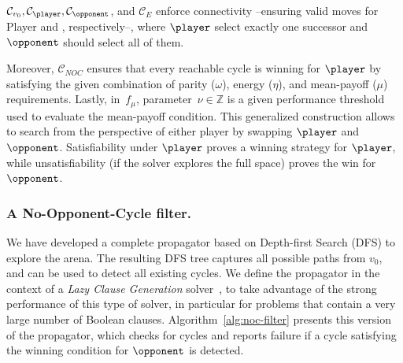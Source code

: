 \documentclass[a4paper,UKenglish,cleveref, autoref, thm-restate, anonymous]{lipics-v2021}
\begin{document}
$\mathcal{C}_{v_0}, \mathcal{C}_{\player}, \mathcal{C}_{\opponent}$, and $\mathcal{C}_{\!E}$ enforce connectivity --ensuring valid moves for Player \even and \odd, respectively--, where $\player$ select exactly one successor and $\opponent$ should select all of them.  

Moreover, $\mathcal{C}_{\!N\!O\!C}$ ensures that every reachable cycle is winning for $\player$ by satisfying the given combination of parity ($\omega$), energy ($\eta$), and mean-payoff ($\mu$) requirements. Lastly, in~$f_\mu$, parameter~$\nu \in \mathbb{Z}$ is a given performance threshold used to evaluate the mean-payoff condition. This generalized construction allows \nocq to search from the perspective of either player by swapping $\player$ and $\opponent$. Satisfiability under $\player$ proves a winning strategy for $\player$, while unsatisfiability (if the solver explores the full space) proves the win for $\opponent$.

\subsubsection{A No-Opponent-Cycle filter.} \label{sec:nocfilter}
We have developed a complete propagator based on Depth-first Search (DFS) to explore the arena. The resulting DFS tree captures all possible paths from $v_0$, and can be used to detect all existing cycles. We define the propagator in the context of a \textit{Lazy Clause Generation} solver~\cite{DBLP:journals/constraints/OhrimenkoSC09}, to take advantage of the strong performance of this type of solver, in particular for problems that contain a very large number of Boolean clauses. Algorithm~\ref{alg:noc-filter} presents this version of the propagator, which checks for cycles and reports failure if a cycle 
satisfying the winning condition for 
$\opponent$ is detected.
\end{document}
